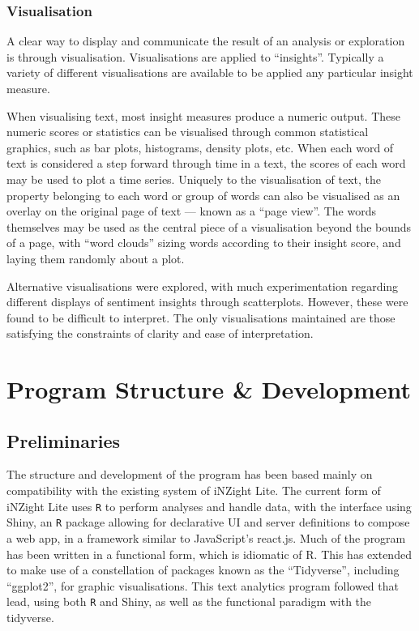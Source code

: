 \documentclass[11pt, a4paper, titlepage]{report}
\begin{document}
\subsection{Visualisation}\label{sec:visualisation-1}

A clear way to display and communicate the result of an analysis or
exploration is through visualisation. Visualisations are applied to
``insights''. Typically a variety of different visualisations are
available to be applied any particular insight measure.

When visualising text, most insight measures produce a numeric output.
These numeric scores or statistics can be visualised through common
statistical graphics, such as bar plots, histograms, density plots,
etc. When each word of text is considered a step forward through time
in a text, the scores of each word may be used to plot a time series.
Uniquely to the visualisation of text, the property belonging to each
word or group of words can also be visualised as an overlay on the
original page of text --- known as a ``page view''. The words
themselves may be used as the central piece of a visualisation beyond
the bounds of a page, with ``word clouds'' sizing words according to
their insight score, and laying them randomly about a plot.

Alternative visualisations were explored, with much experimentation
regarding different displays of sentiment insights through
scatterplots. However, these were found to be difficult to interpret.
The only visualisations maintained are those satisfying the
constraints of clarity and ease of interpretation.

\chapter{Program Structure \&
  Development}\label{cha:program-structure}

\section{Preliminaries}\label{sec:preliminaries}

The structure and development of the program has been based mainly on
compatibility with the existing system of iNZight Lite. The current
form of iNZight Lite uses \texttt{R} to perform analyses and handle
data, with the interface using Shiny, an \texttt{R} package allowing
for declarative UI and server definitions to compose a web app, in a
framework similar to JavaScript's react.js\autocite{chang19}. Much of
the program has been written in a functional form, which is idiomatic
of R. This has extended to make use of a constellation of packages
known as the ``Tidyverse''\autocite{wickham17tidy}, including
``ggplot2''\autocite{wickham16ggplt}, for graphic visualisations. This
text analytics program followed that lead, using both \texttt{R} and
Shiny, as well as the functional paradigm with the tidyverse.
\end{document}
